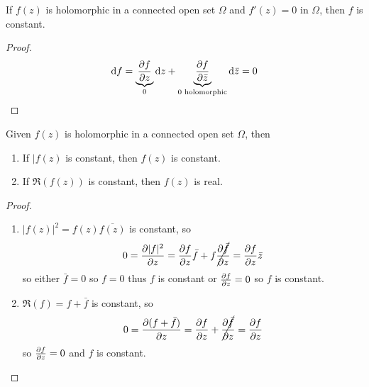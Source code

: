 \documentclass[a4paper,12pt]{article}
\begin{document}
\begin{itemize}
    \begin{lemma}
        If $f(z)$ is holomorphic in a connected open set $\Omega$ and $f'(z)=0$ in $\Omega$, then $f$ is constant.
        \begin{proof}
            \begin{equation}
                \dd f=\underbrace{\partialderivative{f}{z}}_{0}\dd z+\underbrace{\partialderivative{f}{\bar z}}_{0\text{ holomorphic}}\dd\bar z=0
            \end{equation}
        \end{proof}
    \end{lemma}
    \begin{proposition}
        Given $f(z)$ is holomorphic in a connected open set $\Omega$, then
        \begin{enumerate}
            \item If $|f(z)$ is constant, then $f(z)$ is constant.
            \item If $\Re(f(z))$ is constant, then $f(z)$ is real.
        \end{enumerate}
        \begin{proof}
            \begin{enumerate}
                \item $|f(z)|^2=f(z)\overline{f(z)}$ is constant, so \begin{align}
                    0=\partialderivative{|f|^2}{z}=\partialderivative{f}{z}\bar f+f\cancel{\partialderivative{\bar f}{z}}=\partialderivative{f}{z}\bar z
                \end{align}
                so either $\bar f=0$ so $f=0$ thus $f$ is constant or $\partialderivative{f}{z}=0$ so $f$ is constant.
                \item $\Re(f)=f+\bar f$ is constant, so \begin{align}
                    0=\partialderivative{(f+\bar f)}{z}=\partialderivative{f}{z}+\cancel{\partialderivative{\bar f}{z}}=\partialderivative{f}{z}
                \end{align}
                so $\partialderivative{f}{z}=0$ and $f$ is constant.
            \end{enumerate}
        \end{proof}
    \end{proposition}
\end{itemize}
\end{document}

